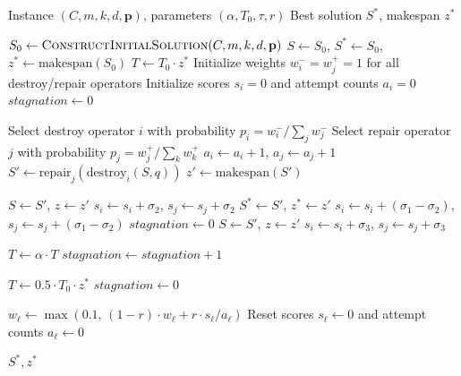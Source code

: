 \documentclass{article}
\begin{document}
\begin{algorithm}[H]
\caption{ALNS Framework (per GPU instance)}
\label{alg:alns}
\begin{algorithmic}[1]
\Require Instance $(C, m, k, d, \mathbf{p})$, parameters $(\alpha, T_0, \tau, r)$
\Ensure Best solution $S^*$, makespan $z^*$

\State $S_0 \gets \textsc{ConstructInitialSolution}(C, m, k, d, \mathbf{p})$
\State $S \gets S_0$, $S^* \gets S_0$, $z^* \gets \text{makespan}(S_0)$
\State $T \gets T_0 \cdot z^*$ 
\State Initialize weights $w_i^{-} = w_j^{+} = 1$ for all destroy/repair operators
\State Initialize scores $s_i = 0$ and attempt counts $a_i = 0$
\State $\textit{stagnation} \gets 0$

    \State Select destroy operator $i$ with probability $p_i = w_i^{-} / \sum_j w_j^{-}$
    \State Select repair operator $j$ with probability $p_j = w_j^{+} / \sum_k w_k^{+}$
    \State $a_i \gets a_i + 1$, $a_j \gets a_j + 1$ 
    \State $S' \gets \text{repair}_j(\text{destroy}_i(S, q))$ 
    \State $z' \gets \text{makespan}(S')$

     
        \State $S \gets S'$, $z \gets z'$
        \State $s_i \gets s_i + \sigma_2$, $s_j \gets s_j + \sigma_2$
         
            \State $S^* \gets S'$, $z^* \gets z'$
            \State $s_i \gets s_i + (\sigma_1 - \sigma_2)$, $s_j \gets s_j + (\sigma_1 - \sigma_2)$
            \State $\textit{stagnation} \gets 0$
        \EndIf
     
        \State $S \gets S'$, $z \gets z'$
        \State $s_i \gets s_i + \sigma_3$, $s_j \gets s_j + \sigma_3$
    \EndIf

    \State $T \gets \alpha \cdot T$ 
    \State $\textit{stagnation} \gets \textit{stagnation} + 1$

     
        \State $T \gets 0.5 \cdot T_0 \cdot z^*$
        \State $\textit{stagnation} \gets 0$
    \EndIf

     
            \State $w_\ell \gets \max(0.1,\, (1-r) \cdot w_\ell + r \cdot s_\ell / a_\ell)$
        \EndFor
        \State Reset scores $s_\ell \gets 0$ and attempt counts $a_\ell \gets 0$
    \EndIf
\EndFor

\State \Return $S^*, z^*$
\end{algorithmic}
\end{algorithm}
\end{document}
